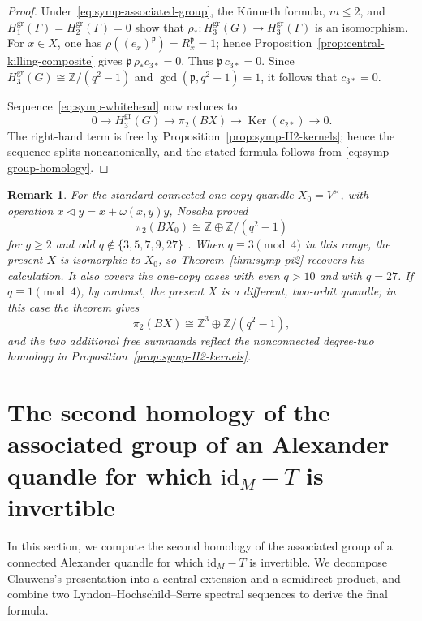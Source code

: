\documentclass[10pt,a4paper]{amsart}
\newtheorem{remark}[theorem]{Remark}
\DeclareMathOperator{\Ker}{Ker}
\newcommand{\ZZ}{\mathbb Z}
\newcommand{\gr}{\mathrm{gr}}
\begin{document}
\begin{proof}
Under~\eqref{eq:symp-associated-group}, the K\"unneth formula, $m\le2$, and
$H_1^{\gr}(\Gamma)=H_2^{\gr}(\Gamma)=0$ show that
$\rho_*\colon H_3^{\gr}(G)\to H_3^{\gr}(\Gamma)$ is an isomorphism. For
$x\in X$, one has
$\rho((e_x)^{\mathfrak p})=R_x^{\mathfrak p}=1$; hence
Proposition~\ref{prop:central-killing-composite} gives
$\mathfrak p\,\rho_*c_{3*}=0$. Thus
$\mathfrak p\,c_{3*}=0$. Since
$H_3^{\gr}(G)\cong\ZZ/(q^2-1)$ and
$\gcd(\mathfrak p,q^2-1)=1$, it follows that $c_{3*}=0$.

Sequence~\eqref{eq:symp-whitehead} now reduces to
\[
 0\longrightarrow H_3^{\gr}(G)
 \longrightarrow\pi_2(BX)
 \longrightarrow\Ker(c_{2*})
 \longrightarrow0.
\]
The right-hand term is free by Proposition~\ref{prop:symp-H2-kernels}; hence
the sequence splits noncanonically, and the stated formula follows from
\eqref{eq:symp-group-homology}.
\end{proof}

\begin{remark}
\label{rem:symp-pi2-nosaka}
For the standard connected one-copy quandle
$X_0=V^\times$, with operation $x\lhd y=x+\omega(x,y)y$, Nosaka proved
\[
 \pi_2(BX_0)\cong\ZZ\oplus\ZZ/(q^2-1)
\]
for $g\ge2$ and odd $q\notin\{3,5,7,9,27\}$
\cite[Equation~(18) and Theorem~7.4(I)]{NosakaHomotopical}.
When $q\equiv3\pmod4$ in this range, the present $X$ is isomorphic to
$X_0$, so Theorem~\ref{thm:symp-pi2} recovers his calculation. It also covers
the one-copy cases with even $q>10$ and with $q=27$. If
$q\equiv1\pmod4$, by contrast, the present $X$ is a different, two-orbit
quandle; in this case the theorem gives
\[
 \pi_2(BX)\cong\ZZ^3\oplus\ZZ/(q^2-1),
\]
and the two additional free summands reflect the nonconnected degree-two
homology in Proposition~\ref{prop:symp-H2-kernels}.
\end{remark}



\section{The second homology of the associated group of an Alexander quandle for which \texorpdfstring{$\mathrm{id}_M-T$}{idM-T} is invertible}

In this section, we compute the second homology of the associated group of a
connected Alexander quandle for which $\mathrm{id}_M-T$ is invertible. We
decompose Clauwens's presentation into a central extension and a semidirect
product, and combine two Lyndon--Hochschild--Serre spectral sequences to
derive the final formula.
\end{document}
